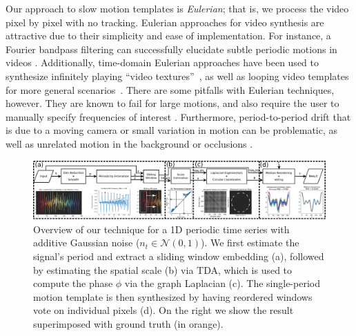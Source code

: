 \documentclass{article}
\begin{document}
Our approach to slow motion templates is {\em Eulerian}; that is, we process the video pixel by pixel with no tracking.  Eulerian approaches for video synthesis are attractive due to their simplicity and ease of implementation.  For instance, a Fourier bandpass filtering can successfully elucidate subtle periodic motions in videos \cite{wu2012eulerian, wadhwa2013phase}.  Additionally, time-domain Eulerian approaches have been used to synthesize infinitely playing ``video textures''~\cite{schodl2000video}, as well as looping video templates for more general scenarios~\cite{Liao2013VideoLoops,Liao2015VideoLoops}.  There are some pitfalls with Eulerian techniques, however.  They are known to fail for large motions, and also require the user to manually specify frequencies of interest \cite{wu2012eulerian, wadhwa2013phase}.  Furthermore, period-to-period drift that is due to a moving camera or small variation in motion can be problematic, as well as unrelated motion in the background or occlusions \cite{stauffer1999adaptive}.

\begin{figure}
\centering
\includegraphics[width=\textwidth]{BlockDiagram.pdf}
	\caption{Overview of our technique for a 1D periodic time series with additive Gaussian noise ($n_t \in \mathcal{N}(0, 1)$). We first estimate the signal's period and extract a sliding window embedding (a), followed by estimating the spatial scale (b) via TDA, which is used to compute the phase $\phi$ via the graph Laplacian (c). The single-period motion template is then synthesized by having reordered windows vote on individual pixels (d). On the right we show the result superimposed with ground truth (in orange).}
\label{fig:ConceptFigure}
\end{figure}
\end{document}
